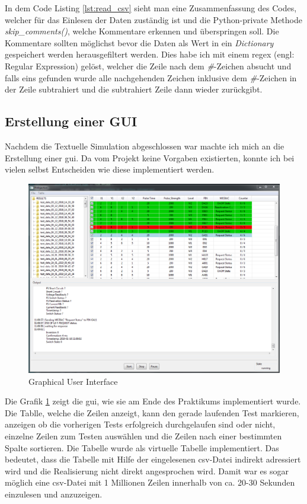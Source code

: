 
In dem Code Listing \ref{lst:read_csv} sieht man eine Zusammenfassung des Codes, welcher für 
das Einlesen der Daten zuständig ist und die Python-private Methode \textit{skip\_comments()}, 
welche Kommentare erkennen und überspringen soll. Die Kommentare sollten möglichst bevor die 
Daten als Wert in ein \textit{Dictionary} gespeichert werden herausgefiltert werden. Dies habe 
ich mit einem \ac{regex} (engl: Regular Expression) gelöst, welcher die Zeile nach dem 
\textit{\#}-Zeichen absucht und falls eins gefunden wurde alle nachgehenden Zeichen inklusive 
dem \textit{\#}-Zeichen in der Zeile subtrahiert und die subtrahiert Zeile dann wieder 
zurückgibt.


\subsection{Erstellung einer GUI}
\label{subsec:create_gui}

Nachdem die Textuelle Simulation abgeschlossen war machte ich mich an die Erstellung einer \ac{gui}. Da vom Projekt keine Vorgaben existierten, konnte ich bei vielen selbst Entscheiden wie diese implementiert werden.

\begin{figure}[H]
	\centering
	\includegraphics[width=1\textwidth, height=0.75\textwidth]{graphics/GUI.png}
	\caption{Graphical User Interface}
	\label{fig:pipeline}
\end{figure}

Die Grafik \ref{fig:pipeline} zeigt die \ac{gui}, wie sie am Ende des Praktikums implementiert wurde. Die Tablle, welche die Zeilen anzeigt, kann den gerade laufenden Test markieren, anzeigen ob die vorherigen Tests erfolgreich durchgelaufen sind oder nicht, einzelne Zeilen zum Testen auswählen und die Zeilen nach einer bestimmten Spalte sortieren. 
Die Tabelle wurde als virtuelle Tabelle implementiert. Das bedeutet, dass die Tabelle mit Hilfe der eingelesenen \ac{csv}-Datei indirekt adressiert wird und die Realisierung nicht direkt angesprochen wird. Damit war es sogar möglich eine \ac{csv}-Datei mit 1 Millionen Zeilen innerhalb von ca. 20-30 Sekunden einzulesen und anzuzeigen.
